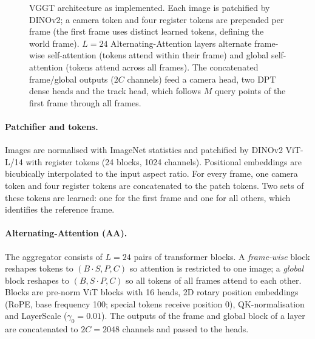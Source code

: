 \documentclass[11pt,a4paper]{article}
\begin{document}
\begin{figure}[t]
{}
\caption{VGGT architecture as implemented. Each image is patchified by DINOv2; a camera token and four register tokens are
prepended per frame (the first frame uses distinct learned tokens, defining the world frame). $L{=}24$ Alternating-Attention
layers alternate frame-wise self-attention (tokens attend within their frame) and global self-attention (tokens attend across
all frames). The concatenated frame/global outputs ($2C$ channels) feed a camera head, two DPT dense heads and the track
head, which follows $M$ query points of the first frame through all frames.}
\label{fig:arch}
\end{figure}

\paragraph{Patchifier and tokens.} Images are normalised with ImageNet statistics and patchified by DINOv2 ViT-L/14 with
register tokens (24 blocks, 1024 channels). Positional embeddings are bicubically interpolated to the input aspect ratio.
For every frame, one camera token and four register tokens are concatenated to the patch tokens. Two sets of these
tokens are learned: one for the first frame and one for all others, which identifies the reference frame.

\paragraph{Alternating-Attention (AA).} The aggregator consists of $L=24$ pairs of transformer blocks. A
\emph{frame-wise} block reshapes tokens to $(B\!\cdot\!S, P, C)$ so attention is restricted to one image; a
\emph{global} block reshapes to $(B, S\!\cdot\!P, C)$ so all tokens of all frames attend to each other. Blocks are pre-norm
ViT blocks with 16 heads, 2D rotary position embeddings (RoPE, base frequency 100; special tokens receive position 0),
QK-normalisation and LayerScale ($\gamma_0 = 0.01$). The outputs of the frame and global block of a layer are concatenated to
$2C = 2048$ channels and passed to the heads.
\end{document}
